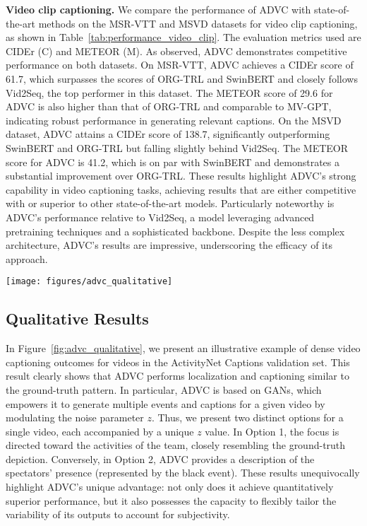 \textbf{Video clip captioning.}
We compare the performance of ADVC with state-of-the-art methods on the MSR-VTT and MSVD datasets for video clip captioning, as shown in Table~\ref{tab:performance_video_clip}.
The evaluation metrics used are CIDEr (C) and METEOR (M).
As observed, ADVC demonstrates competitive performance on both datasets.
On MSR-VTT, ADVC achieves a CIDEr score of 61.7, which surpasses the scores of ORG-TRL and SwinBERT and closely follows Vid2Seq, the top performer in this dataset.
The METEOR score of 29.6 for ADVC is also higher than that of ORG-TRL and comparable to MV-GPT, indicating robust performance in generating relevant captions.
On the MSVD dataset, ADVC attains a CIDEr score of 138.7, significantly outperforming SwinBERT and ORG-TRL but falling slightly behind Vid2Seq.
The METEOR score for ADVC is 41.2, which is on par with SwinBERT and demonstrates a substantial improvement over ORG-TRL.
These results highlight ADVC's strong capability in video captioning tasks, achieving results that are either competitive with or superior to other state-of-the-art models.
Particularly noteworthy is ADVC's performance relative to Vid2Seq, a model leveraging advanced pretraining techniques and a sophisticated backbone.
Despite the less complex architecture, ADVC's results are impressive, underscoring the efficacy of its approach.

\begin{sidewaysfigure}
    \centering
    \texttt{[image: figures/advc\_qualitative]}
    \caption{Example of ADVC's dense video captioning on the ActivityNet Captions validation set.}
    \label{fig:advc_qualitative}
\end{sidewaysfigure}

\subsection{Qualitative Results}
In Figure~\ref{fig:advc_qualitative}, we present an illustrative example of dense video captioning outcomes for videos in the ActivityNet Captions validation set.
This result clearly shows that ADVC performs localization and captioning similar to the ground-truth pattern.
In particular, ADVC is based on GANs, which empowers it to generate multiple events and captions for a given video by modulating the noise parameter $z$.
Thus, we present two distinct options for a single video, each accompanied by a unique $z$ value.
In Option 1, the focus is directed toward the activities of the team, closely resembling the ground-truth depiction. 
Conversely, in Option 2, ADVC provides a description of the spectators' presence (represented by the black event).
These results unequivocally highlight ADVC's unique advantage: not only does it achieve quantitatively superior performance, but it also possesses the capacity to flexibly tailor the variability of its outputs to account for subjectivity.

